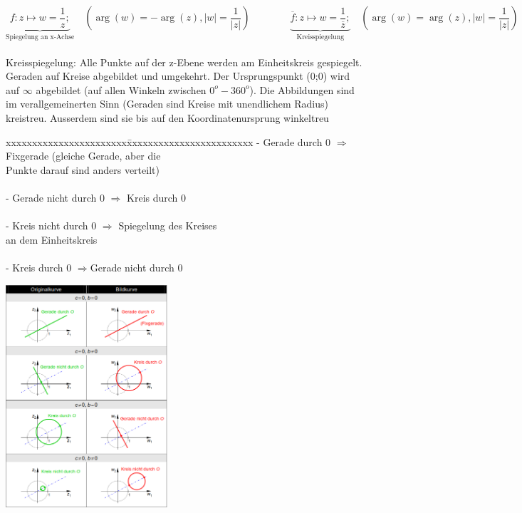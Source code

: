 \newpage
{}
	$$\underbrace{f : z \mapsto w = \frac{1}{z};}_\text{Spiegelung an x-Achse} \quad (\arg(w) = -\arg(z), |w| = \frac{1}{|z|})
	\qquad \qquad 
	\underbrace{\overline{f}: z \mapsto w = \frac{1}{\overline{z}};}_\text{Kreisspiegelung}  \quad  
	(\arg(w) = \arg(z), |w| = \frac{1}{|z|}) $$\\
	Kreisspiegelung: Alle Punkte auf der z-Ebene werden am Einheitskreis gespiegelt.
	Geraden auf Kreise abgebildet und umgekehrt. Der Ursprungspunkt (0;0) wird auf
	$ \infty $ abgebildet (auf allen Winkeln zwischen $0^o-360^o$). Die
	Abbildungen sind
	im verallgemeinerten Sinn (Geraden sind Kreise mit unendlichem Radius)
	kreistreu. Ausserdem sind sie bis auf den Koordinatenursprung winkeltreu\\
	\begin{minipage}{9cm}
		\begin{tabbing}
        	xxxxxxxxxxxxxxxxxxxxxxx\=xxxxxxxxxxxxxxxxxxxxxxxx\kill
	        - Gerade durch 0 $\Longrightarrow$ \>Fixgerade (gleiche Gerade, aber
	        die \\ \>Punkte darauf sind anders verteilt)\\ \\
			- Gerade nicht durch 0 $\Longrightarrow$ Kreis durch 0\\ \\ 
			- Kreis nicht durch 0 $\Longrightarrow$ \>Spiegelung des Kreises\\ \> an dem
			Einheitskreis\\ \\
			- Kreis durch 0 $\Longrightarrow$\>Gerade nicht durch 0
        \end{tabbing}
	\end{minipage}
	\hspace{2cm}
	\begin{minipage}{6cm}
		\includegraphics[width=6cm]{./bilder/Kurvenspiegelung.png}
    \end{minipage}


